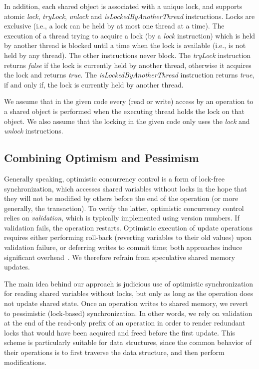 In addition, each shared object is associated with a unique lock, and supports
atomic \emph{lock}, \emph{tryLock}, \emph{unlock} and \emph{isLockedByAnotherThread} instructions.
Locks are exclusive (i.e., a lock can be held by at most one thread at a time).
The execution of a thread
trying to acquire a lock (by a \emph{lock} instruction) which is
held by another thread is blocked until a time when the
lock is available (i.e., is not held by any thread).
The other instructions never block.
The \emph{tryLock} instruction returns \emph{false} if the lock is currently held by another thread, otherwise it acquires the lock and returns \emph{true}.
The \emph{isLockedByAnotherThread} instruction returns \emph{true}, if and only if, the lock is currently held by another thread.

We assume that in the given code every (read
or write) access by an operation to a shared object is performed when the
executing thread holds the lock on that object.
We also assume that the locking in the given code only uses the \emph{lock} and \emph{unlock} instructions.

\subsection{Combining Optimism and Pessimism}\label{ssec:overview}

Generally speaking, optimistic concurrency control is a form of lock-free synchronization, which accesses shared variables without locks in the hope that they will not be modified by others before the end of the operation (or more generally, the transaction). To verify the latter, optimistic concurrency control relies on \emph{validation}, which is typically implemented using version numbers. If validation fails, the operation restarts. Optimistic execution of update operations requires either performing roll-back (reverting variables to their old values) upon validation failure, or deferring writes to commit time; both approaches induce significant overhead~\cite{Cascaval:2008}. We therefore refrain from speculative shared memory updates.



The main idea behind our approach is judicious use of optimistic synchronization for reading
shared variables without locks, but only as long as the operation does not update shared state. Once an operation
writes to shared memory, we revert to pessimistic (lock-based) synchronization. In
other words, we rely on validation at the end of the read-only prefix of an operation in order to render redundant
locks that would have been acquired and freed before the first update.
This scheme is particularly suitable for data structures,
since the common behavior of their operations
is to first traverse the data structure, and then
perform modifications.

